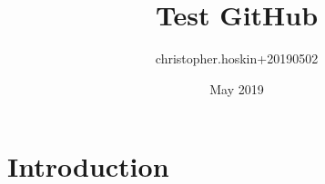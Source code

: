 \documentclass{article}
\title{Test GitHub}
\author{christopher.hoskin+20190502 }
\date{May 2019}
\begin{document}
\maketitle

\section{Introduction}
\end{document}

